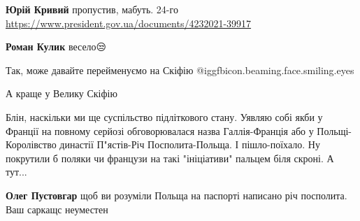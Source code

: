 \begin{itemize}
\begin{itemize}
\textbf{Юрій Кривий} пропустив, мабуть. 24-го
\url{https://www.president.gov.ua/documents/4232021-39917}

 
\textbf{Роман Кулик} весело😒
\end{itemize}

 
Так, може давайте перейменуємо на Скіфію @igg{fbicon.beaming.face.smiling.eyes} 

\begin{itemize}
 
А краще у Велику Скіфію
\end{itemize}

 

Блін, наскільки ми ще суспільство підліткового стану. Уявляю собі якби у Франції
на повному серйозі обговорювалася назва Галлія-Франція або у Польщі-
Королівство династії П"ястів-Річ Посполита-Польща. І пішло-поїхало. Ну
покрутили б поляки чи французи на такі "ініціативи" пальцем біля скроні. А
тут...

\begin{itemize}
 
\textbf{Олег Пустовгар} щоб ви розуміли Польща на паспорті написано річ посполита. Ваш саркащс неуместен


\end{itemize}
\end{itemize}

